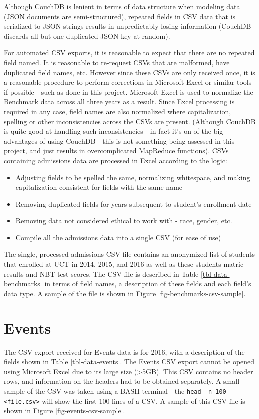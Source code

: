 Although CouchDB is lenient in terms of data structure when modeling data (JSON documents are semi-structured), repeated fields in CSV data that is serialized to JSON strings results in unpredictably losing information (CouchDB discards all but one duplicated JSON key at random).

For automated CSV exports, it is reasonable to expect that there are no repeated field named. It is reasonable to re-request CSVs that are malformed, have duplicated field names, etc. However since these CSVs are only received once, it is a reasonable procedure to perform corrections in Microsoft Excel or similar tools if possible - such as done in this project. Microsoft Excel is used to normalize the Benchmark data across all three years as a result. Since Excel processing is required in any case, field names are also normalized where capitalization, spelling or other inconsistencies across the CSVs are present. (Although CouchDB is quite good at handling such inconsistencies - in fact it's on of the big advantages of using CouchDB - this is not something being assessed in this project, and just results in overcomplicated MapReduce functions). CSVs containing admissions data are processed in Excel according to the logic:

\begin{itemize}
    \item Adjusting fields to be spelled the same, normalizing whitespace, and making capitalization consistent for fields with the same name
    \item Removing duplicated fields for years subsequent to student's enrollment date
    \item Removing data not considered ethical to work with - race, gender, etc.
    \item Compile all the admissions data into a single CSV (for ease of use)
\end{itemize}

The single, processed admissions CSV file contains an anonymized list of students that enrolled at UCT in 2014, 2015, and 2016 as well as these students matric results and NBT test scores. The CSV file is described in Table \ref{tbl-data-benchmarks} in terms of field names, a description of these fields and each field's data type. A sample of the file is shown in Figure \ref{fig-benchmarks-csv-sample}.




\section{Events}
The CSV export received for Events data is for 2016, with a description of the fields shown in Table \ref{tbl-data-events}. The Events CSV export cannot be opened using Microsoft Excel due to its large size (\textgreater 5GB). This CSV contains no header rows, and information on the headers had to be obtained separately. A small sample of the CSV was taken using a BASH terminal - the \texttt{head -n 100 <file.csv>} will show the first 100 lines of a CSV. A sample of this CSV file is shown in Figure \ref{fig-events-csv-sample}.


